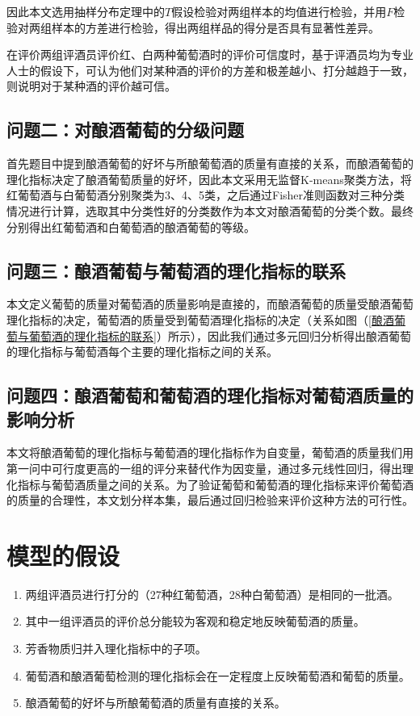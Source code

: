 \documentclass[withoutpreface,bwprint]{cumcmthesis} %
\begin{document}
因此本文选用抽样分布定理中的$T$假设检验对两组样本的均值进行检验，并用$F$检验对两组样本的方差进行检验，得出两组样品的得分是否具有显著性差异。
\par 在评价两组评酒员评价红、⽩两种葡萄酒时的评价可信度时，基于评酒员均为专业⼈⼠的假设下，可认为他们对某种酒的评价的方差和极差越小、打分越趋于一致，则说明对于某种酒的评价越可信。

\subsection{问题二：对酿酒葡萄的分级问题}

\par 首先题目中提到酿酒葡萄的好坏与所酿葡萄酒的质量有直接的关系，而酿酒葡萄的理化指标决定了酿酒葡萄质量的好坏，因此本文采用无监督K-means聚类方法，将红葡萄酒与白葡萄酒分别聚类为3、4、5类，之后通过Fisher准则函数对三种分类情况进行计算，选取其中分类性好的分类数作为本文对酿酒葡萄的分类个数。最终分别得出红葡萄酒和白葡萄酒的酿酒葡萄的等级。

\subsection{问题三：酿酒葡萄与葡萄酒的理化指标的联系}


\par 本文定义葡萄的质量对葡萄酒的质量影响是直接的，而酿酒葡萄的质量受酿酒葡萄理化指标的决定，葡萄酒的质量受到葡萄酒理化指标的决定（关系如图（\ref{酿酒葡萄与葡萄酒的理化指标的联系}）所示），因此我们通过多元回归分析得出酿酒葡萄的理化指标与葡萄酒每个主要的理化指标之间的关系。

\subsection{问题四：酿酒葡萄和葡萄酒的理化指标对葡萄酒质量的影响分析}

\par 本文将酿酒葡萄的理化指标与葡萄酒的理化指标作为自变量，葡萄酒的质量我们用第一问中可行度更高的一组的评分来替代作为因变量，通过多元线性回归，得出理化指标与葡萄酒质量之间的关系。为了验证葡萄和葡萄酒的理化指标来评价葡萄酒的质量的合理性，本文划分样本集，最后通过回归检验来评价这种方法的可行性。 

\section{模型的假设}

\begin{enumerate}
	\item 两组评酒员进行打分的（27种红葡萄酒，28种白葡萄酒）是相同的一批酒。
	\item 其中一组评酒员的评价总分能较为客观和稳定地反映葡萄酒的质量。
	\item 芳香物质归并入理化指标中的子项。
	\item 葡萄酒和酿酒葡萄检测的理化指标会在一定程度上反映葡萄酒和葡萄的质量。
	\item 酿酒葡萄的好坏与所酿葡萄酒的质量有直接的关系。
\end{enumerate}
\end{document}
